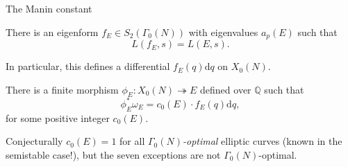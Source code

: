\documentclass[10pt]{beamer}
\begin{document}
{
\begin{frame}

\vspace{3cm}

\begin{minipage}{0.09\textwidth}\hfill\end{minipage}

\end{frame}
}

\begin{frame}[t]{The Manin constant}

\begin{theorem}
There is an eigenform $ f_E \in S_2(\Gamma_0(N)) $ with eigenvalues $ a_p(E) $ such that
$$ L(f_E, s) = L(E, s). $$
\end{theorem}

In particular, this defines a differential $ f_E(q)\mathrm{d}q $ on $ X_0(N) $.

\pause

\begin{theorem}
There is a finite morphism $ \phi_E : X_0(N) \twoheadrightarrow E $ defined over $ \mathbb{Q} $ such that
$$ \phi_E^*\omega_E = c_0(E) \cdot f_E(q)\mathrm{d}q, $$
for some positive integer $ c_0(E) $.
\end{theorem}

\pause

\vspace{0.5cm} Conjecturally $ c_0(E) = 1 $ for all \emph{$ \Gamma_0(N) $-optimal} elliptic curves (known in the semistable case!), but the seven exceptions are not $ \Gamma_0(N) $-optimal.

\end{frame}
\end{document}
